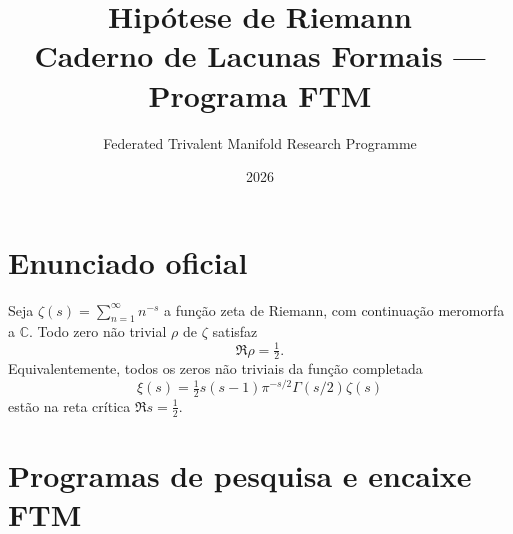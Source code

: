 \documentclass[11pt,a4paper]{article}
\title{Hipótese de Riemann\\[4pt]
       \large Caderno de Lacunas Formais — Programa FTM}
\author{Federated Trivalent Manifold Research Programme}
\date{2026}
\begin{document}
\maketitle
\tableofcontents
\bigskip

\section{Enunciado oficial}

\begin{definition}
Seja $\zeta(s)=\sum_{n=1}^\infty n^{-s}$ a função zeta de Riemann,
com continuação meromorfa a $\mathbb C$.
Todo zero não trivial $\rho$ de $\zeta$ satisfaz
\[
  \Re\rho = \tfrac{1}{2}.
\]
Equivalentemente, todos os zeros não triviais da função completada
\[
  \xi(s) = \tfrac{1}{2}s(s-1)\pi^{-s/2}\Gamma(s/2)\zeta(s)
\]
estão na reta crítica $\Re s=\tfrac12$.
\end{definition}

\bigskip

\section{Programas de pesquisa e encaixe FTM}
\end{document}
